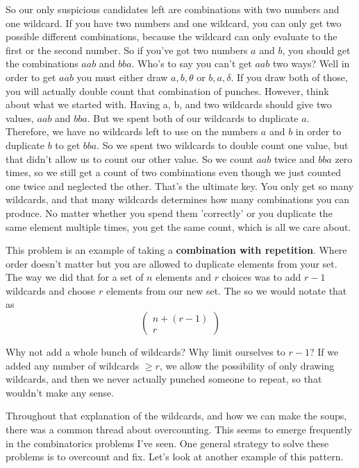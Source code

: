 \documentclass{article}
\begin{document}
    So our only suspicious candidates left are combinations with two numbers and one wildcard.
    If you have two numbers and one wildcard, you can only get two possible different combinations, because the wildcard can only evaluate to the first or the second number.
    So if you've got two numbers $a$ and $b$, you should get the combinations $aab$ and $bba$. 
    Who's to say you can't get $aab$ two ways?
    Well in order to get $aab$ you must either draw $a, b, \theta$ or $b, a, \delta$.
    If you draw both of those, you will actually double count that combination of punches.
    However, think about what we started with.
    Having a, b, and two wildcards should give two values, $aab$ and $bba$.
    But we spent both of our wildcards to duplicate $a$.
    Therefore, we have no wildcards left to use on the numbers $a$ and $b$ in order to duplicate $b$ to get $bba$.
    So we spent two wildcards to double count one value, but that didn't allow us to count our other value.
    So we count $aab$ twice and $bba$ zero times, so we still get a count of two combinations even though we just counted one twice and neglected the other.
    That's the ultimate key.
    You only get so many wildcards, and that many wildcards determines how many combinations you can produce.
    No matter whether you spend them 'correctly' or you duplicate the same element multiple times, you get the same count, which is all we care about.

    This problem is an example of taking a \textbf{combination with repetition}.
    Where order doesn't matter but you are allowed to duplicate elements from your set.
    The way we did that for a set of $n$ elements and $r$ choices was to add $r-1$ wildcards and choose $r$ elements from our new set.
    The so we would notate that as
    \begin{displaymath}
        \left ( 
            \begin{matrix}
                n + (r-1)\\
                r
            \end{matrix}    
        \right)
    \end{displaymath}

    Why not add a whole bunch of wildcards?
    Why limit ourselves to $r-1$?
    If we added any number of wildcards $\geq r$, we allow the possibility of only drawing wildcards, and then we never actually punched someone to repeat, so that wouldn't make any sense.

    Throughout that explanation of the wildcards, and how we can make the soups, there was a common thread about overcounting.
    This seems to emerge frequently in the combinatorics problems I've seen.
    One general strategy to solve these problems is to overcount and fix.
    Let's look at another example of this pattern.
\end{document}
